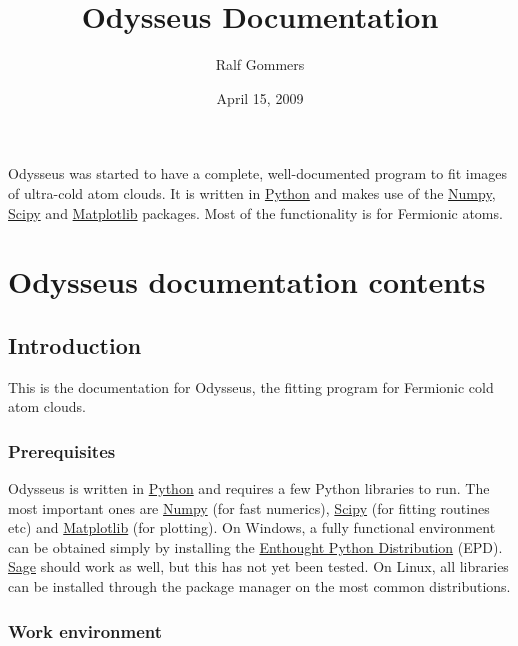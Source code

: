 \documentclass[letterpaper,10pt,english]{manual}
\title{Odysseus Documentation}
\date{April 15, 2009}
\author{Ralf Gommers}
\begin{document}
\maketitle
\tableofcontents



Odysseus was started to have a complete, well-documented program to fit images of ultra-cold atom clouds. It is written in \href{http://python.org}{Python} and makes use of the \href{http://scipy.org/NumPy}{Numpy}, \href{http://scipy.org/}{Scipy} and \href{http://matplotlib.sourceforge.net/}{Matplotlib} packages. Most of the functionality is for Fermionic atoms.


\chapter{Odysseus documentation contents}

\resetcurrentobjects


\section{Introduction}

This is the documentation for Odysseus, the fitting program for Fermionic cold atom clouds.


\subsection{Prerequisites}

Odysseus is written in \href{http://python.org}{Python} and requires a few Python libraries to run. The most important ones are \href{http://scipy.org/NumPy}{Numpy} (for fast numerics), \href{http://scipy.org/}{Scipy} (for fitting routines etc) and \href{http://matplotlib.sourceforge.net/}{Matplotlib} (for plotting). On Windows, a fully functional environment can be obtained simply by installing the \href{http://enthought.com/products/epd.php}{Enthought Python Distribution} (EPD). \href{http://www.sagemath.org/}{Sage} should work as well, but this has not yet been tested. On Linux, all libraries can be installed through the package manager on the most common distributions.


\subsection{Work environment}
\end{document}
